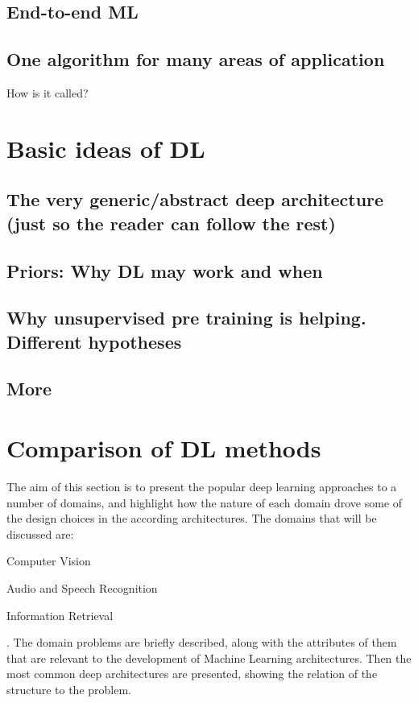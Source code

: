 \documentclass[a4paper]{report}
\begin{document}
	\subsection{End-to-end ML}
	\subsection{One algorithm for many areas of application}
	How is it called?
\section{Basic ideas of DL}
	\subsection{The very generic/abstract deep architecture (just so the reader can follow the rest)}
	\subsection{Priors: Why DL may work and when}
	\subsection{Why unsupervised pre training is helping. Different hypotheses}	
	\subsection{More}
\section{Comparison of DL methods}
	The aim of this section is to present the popular deep learning approaches to a number of domains, and highlight how the nature of each domain drove some of the design choices in the according architectures. The domains that will be discussed are:
	\begin{enumerate*}
		\item Computer Vision
		\item Audio and Speech Recognition
		\item Information Retrieval
	\end{enumerate*}.	
	The domain problems are briefly described, along with the attributes of them that are relevant to the development of Machine Learning architectures. Then the most common deep architectures are presented, showing the relation of the structure to the problem.
\end{document}
